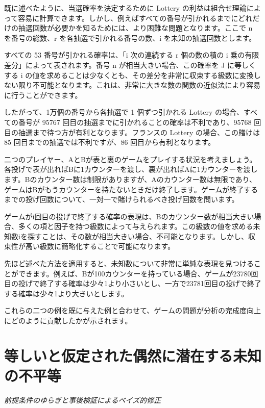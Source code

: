 \documentclass[a4paper,11pt,openany]{ltjsbook}
\begin{document}
既に述べたように、当選確率を決定するために Lottery の利益は組合せ理論によって容易に計算できます。しかし、例えばすべての番号が引かれるまでにどれだけの抽選回数が必要かを知るためには、より困難な問題となります。ここで n を番号の総数、r を各抽選で引かれる番号の数、i を未知の抽選回数とします。

すべての 53 番号が引かれる確率は、「i 次の連続する r 個の数の積の i 乗の有限差分」によって表されます。番号 n が相当大きい場合、この確率を J に等しくする i の値を求めることは少なくとも、その差分を非常に収束する級数に変換しない限り不可能となります。これは、非常に大きな数の関数の近似法により容易に行うことができます。

したがって、1万個の番号から各抽選で 1 個ずつ引かれる Lottery の場合、すべての番号が 95767 回目の抽選までに引かれることの確率は不利であり、95768 回目の抽選まで待つ方が有利となります。フランスの Lottery の場合、この賭けは 85 回目までの抽選では不利ですが、86 回目から有利となります。

二つのプレイヤー、AとBが表と裏のゲームをプレイする状況を考えましょう。各投げで表が出ればBに1カウンターを渡し、裏が出ればAに1カウンターを渡します。Bのカウンター数は制限がありますが、Aのカウンター数は無限であり、ゲームはBがもうカウンターを持たないときだけ終了します。ゲームが終了するまでの投げ回数について、一対一で賭けられるべき投げ回数を問います。

ゲームがi回目の投げで終了する確率の表現は、Bのカウンター数が相当大きい場合、多くの項と因子を持つ級数によって与えられます。この級数の値を求める未知数iを探すことは、その数が相当大きい場合、不可能となります。しかし、収束性が高い級数に簡略化することで可能になります。

先ほど述べた方法を適用すると、未知数について非常に単純な表現を見つけることができます。例えば、Bが100カウンターを持っている場合、ゲームが23780回目の投げで終了する確率は少々1より小さいとし、一方で23781回目の投げで終了する確率は少々1より大きいとします。

これらの二つの例を既に与えた例と合わせて、ゲームの問題が分析の完成度向上にどのように貢献したかが示されます。

\newpage

\chapter{等しいと仮定された偶然に潜在する未知の不平等}
\label{ch:vii}

\begin{center}
\large\textit{前提条件のゆらぎと事後検証によるベイズ的修正}
\end{center}
\vspace{4mm}
\end{document}
